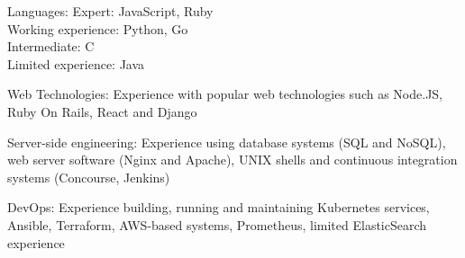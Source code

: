 \documentclass[11pt,a4paper]{article}
\newenvironment{indentsection}[1]%
{\begin{list}{}%
	{\setlength{\leftmargin}{#1}}%
	\item[]%
}
{\end{list}}
\begin{document}
\begin{indentsection}{\parindent}
\begin{description*}
	\item[Languages:]
    Expert: JavaScript, Ruby\\
    Working experience: Python, Go\\
    Intermediate: C\\
    Limited experience: Java
	\item[Web Technologies:]
	    Experience with popular web technologies such as Node.JS, Ruby On Rails, React and Django
	\item[Server-side engineering:]
	Experience using database systems (SQL and NoSQL), web server software (Nginx and Apache), UNIX shells and continuous integration systems (Concourse, Jenkins)
        \item[DevOps:] Experience building, running and maintaining Kubernetes services, Ansible, Terraform, AWS-based systems, Prometheus, limited ElasticSearch experience
\end{description*}
\end{indentsection}

\end{document}
